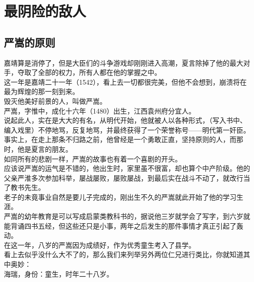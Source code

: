 \section{最阴险的敌人}
\ifnum{}
	\begin{multicols}{\theparacolNo}
\fi
\subsection{严嵩的原则}
嘉靖算是消停了，但是大臣们的斗争游戏却刚刚进入高潮，夏言除掉了他的最大对手，夺取了全部的权力，所有人都在他的掌握之中。\\

这一年是嘉靖二十一年（1542），看上去一切都很完美，但他不会想到，崩溃将在最为辉煌的那一刻到来。\\

毁灭他美好前景的人，叫做严嵩。\\

严嵩，字惟中，成化十六年（1480）出生，江西袁州府分宜人。\\

说起此人，实在是大大的有名，从明代开始，他就被人以各种形式，（写入书中、编入戏里）不停地骂，反复地骂，并最终获得了一个荣誉称号——明代第一奸臣。\\

事实上，在走上那条不归路之前，他曾经是一个勇敢正直，坚持原则的人，而那时，他是夏言的朋友。\\

如同所有的悲剧一样，严嵩的故事也有着一个喜剧的开头。\\

应该说严嵩的运气是不错的，他出生时，家里虽不很富，却也算个中产阶级。他的父亲严淮多次参加科举，屡战屡败，屡败屡战，到最后实在战斗不动了，就改行当了教书先生。\\

老子的未竟事业自然是要儿子完成的，刚出生不久的严嵩就此开始了他的学习生涯。\\

严嵩的幼年教育是可以写成启蒙类教科书的，据说他三岁就学会了写字，到六岁就能背诵四书五经，但这些还只是小事，两年之后发生的那件事情才真正引起了轰动。\\

在这一年，八岁的严嵩因为成绩好，作为优秀童生考入了县学。\\

看上去似乎没什么大不了的，那么我们来列举另外两位仁兄进行类比，你就知道其中奥妙：\\

海瑞，身份：童生，时年二十八岁。\\


\end{multicols}

